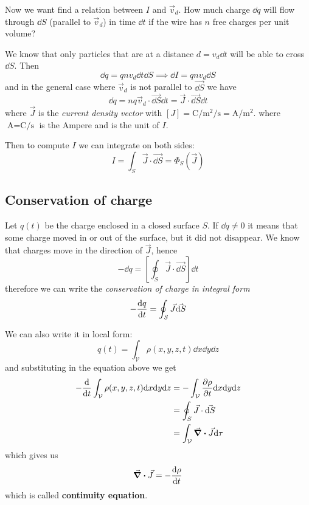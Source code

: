 \documentclass[12pt]{extarticle}
\begin{document}
Now we want find a relation between $I$ and $\vec v_d$.
How much charge $\dd q$ will flow through $\dd S$ (parallel to $\vec v_d$) in time $\dd t$
if the wire has $n$ free charges per unit volume?

We know that only particles that are at a distance $d = v_d \dd t$ will be able to cross $\dd{S}$.
Then
\begin{equation}
    \dd q = q n v_d \dd t \dd S \implies \dd I = q n v_d \dd S
\end{equation}
and in the general case where $\vec v_d$ is not parallel to $\vec{\dd S}$ we have
\begin{equation}
    \dd q = n q \vec v_d \cdot \vec{\dd S} \dd t = \vec J \cdot \vec{\dd S} \dd t
\end{equation}
where $\vec J$ is the \emph{current density vector}
with $[J] = \si{\coulomb \per \meter \squared \per \second} = \si{\ampere \per \meter \squared}$.
where $\si{\ampere} = \si{\coulomb \per \second}$ is the Ampere and is the unit of $I$.

Then to compute $I$ we can integrate on both sides:
\begin{equation}
    I = \int_S \vec J \cdot \vec{\dd{S}} = \Phi_S (\vec J)
\end{equation}

\subsection{Conservation of charge}

Let $q(t)$ be the charge enclosed in a closed surface $S$.
If $\dd q \neq 0$ it means that some charge moved in or out of the surface, but it did not disappear.
We know that charges move in the direction of $\vec J$, hence
\begin{equation}
    -\dd q = \left[\oint_S \vec J \cdot \vec{\dd S}\right] \dd t
\end{equation}
therefore we can write the \emph{conservation of charge in integral form}
\begin{equation}
    - \dv{q}{t} = \oint_S \vec J \vec{\dd S}
\end{equation}

We can also write it in local form:
\begin{equation}
    q(t) = \int_\mathcal{V} \rho(x, y, z, t) \dd x \dd y \dd z
\end{equation}
and substituting in the equation above we get
\begin{align}
    - \dv{t} \int_\mathcal{V} \rho(x, y, z, t) \dd x \dd y \dd z & = - \int_\mathcal{V} \pdv{\rho}{t} \dd x \dd y \dd z \\
                                                                 & = \oint_S \vec J \cdot \vec{\dd S}                   \\
                                                                 & = \int_\mathcal{V} \div \vec J \dd \tau
\end{align}
which gives us
\begin{equation}
    \div \vec J = - \dv{\rho}{t}
\end{equation}
which is called \textbf{continuity equation}.
\end{document}
